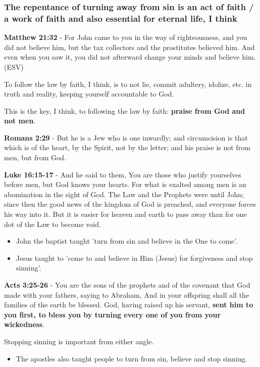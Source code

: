 \documentclass[11pt]{article}
\begin{document}
\subsubsection{The repentance of turning away from sin is an act of faith / a work of faith and also essential for eternal life, I think}
\label{sec:org3882c1d}
\textbf{Matthew 21:32} - For John came to you in the way of righteousness, and you did not believe him, but the tax collectors and the prostitutes believed him. And even when you saw it, you did not afterward change your minds and believe him. (ESV)

To follow the law by faith, I think, is to not lie, commit adultery, idolize, etc. in truth and reality, keeping yourself accountable to God.

This is the key, I think, to following the law by faith: \textbf{praise from God and not men}.

\textbf{Romans 2:29} - But he is a Jew who is one inwardly; and circumcision is that which is of the heart, by the Spirit, not by the letter; and his praise is not from men, but from God.

\textbf{Luke 16:15-17} - And he said to them, You are those who justify yourselves before men, but God knows your hearts. For what is exalted among men is an abomination in the sight of God.  The Law and the Prophets were until John; since then the good news of the kingdom of God is preached, and everyone forces his way into it.  But it is easier for heaven and earth to pass away than for one dot of the Law to become void.

\begin{itemize}
\item John the baptist taught 'turn from sin and believe in the One to come'.
\item Jesus taught to 'come to and believe in Him (Jesus) for forgiveness and stop sinning'.
\end{itemize}

\textbf{Acts 3:25-26} - You are the sons of the prophets and of the covenant that God made with your fathers, saying to Abraham, And in your offspring shall all the families of the earth be blessed. God, having raised up his servant, \textbf{sent him to you first, to bless you by turning every one of you from your wickedness}.

Stopping sinning is important from either angle.

\begin{itemize}
\item The apostles also taught people to turn from sin, believe and stop sinning.
\end{itemize}
\end{document}
